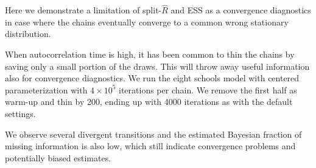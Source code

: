 \documentclass[american,]{article}
\begin{document}
Here we demonstrate a limitation of split-\(\widehat{R}\) and ESS as a
convergence diagnostics in case where the chains eventually converge
to a common wrong stationary distribution.

When autocorrelation time is high, it has been common to thin the
chains by saving only a small portion of the draws. This will throw
away useful information also for convergence diagnostics. We run the
eight schools model with centered parameterization with $4\times 10^5$
iterations per chain. We remove the first half as warm-up and thin by
200, ending up with 4000 iterations as with the default settings.

We observe several divergent transitions and the estimated Bayesian
fraction of missing information is also low, which still indicate
convergence problems and potentially biased estimates.
\end{document}
